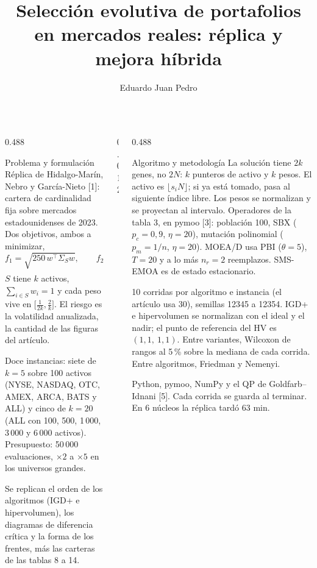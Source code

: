 \documentclass[final]{beamer}
\title{Selección evolutiva de portafolios en mercados reales: réplica y mejora híbrida}
\author{Eduardo \texorpdfstring{\quad\textperiodcentered\quad}{ y }Juan Pedro}
\institute{Tecnológico de Monterrey \quad MA2015.201 \quad Agosto--diciembre 2026}
\begin{document}
\begin{frame}[t]
\vspace{2.5mm}

\begin{columns}[t,onlytextwidth]
\begin{column}{0.488\textwidth}
\begin{block}{Problema y formulación}
Réplica de Hidalgo-Marín, Nebro y García-Nieto [1]: cartera de cardinalidad fija sobre mercados estadounidenses de 2023. Dos objetivos, ambos a minimizar,
\[
f_1=\sqrt{250\,w^{\top}\Sigma_{S}w},
\qquad
f_2=-\sum_{j\in S}w_{j}R_{j}.
\]
\(S\) tiene \(k\) activos, \(\sum_{i\in S} w_i=1\) y cada peso vive en \(\bigl[\tfrac{1}{2k},\tfrac{2}{k}\bigr]\). El riesgo es la volatilidad anualizada, la cantidad de las figuras del artículo.

Doce instancias: siete de \(k=5\) sobre 100 activos (NYSE, NASDAQ, OTC, AMEX, ARCA, BATS y ALL) y cinco de \(k=20\) (ALL con 100, 500, 1\,000, 3\,000 y 6\,000 activos). Presupuesto: 50\,000 evaluaciones, \(\times 2\) a \(\times 5\) en los universos grandes.

Se replican el orden de los algoritmos (IGD+ e hipervolumen), los diagramas de diferencia crítica y la forma de los frentes, más las carteras de las tablas 8 a 14.
\end{block}
\end{column}
\begin{column}{0.012\textwidth}\end{column}
\begin{column}{0.488\textwidth}
\begin{block}{Algoritmo y metodología}
La solución tiene \(2k\) genes, no \(2N\): \(k\) punteros de activo y \(k\) pesos. El activo es \(\lfloor s_{i}N\rfloor\); si ya está tomado, pasa al siguiente índice libre. Los pesos se normalizan y se proyectan al intervalo. Operadores de la tabla 3, en pymoo [3]: población 100, SBX (\(p_{c}=0{,}9\), \(\eta=20\)), mutación polinomial (\(p_{m}=1/n\), \(\eta=20\)). MOEA/D usa PBI (\(\theta=5\)), \(T=20\) y a lo más \(n_{r}=2\) reemplazos. SMS-EMOA es de estado estacionario.

10 corridas por algoritmo e instancia (el artículo usa 30), semillas 12345 a 12354. IGD+ e hipervolumen se normalizan con el ideal y el nadir; el punto de referencia del HV es \((1{,}1,\ 1{,}1)\). Entre variantes, Wilcoxon de rangos al 5\,\% sobre la mediana de cada corrida. Entre algoritmos, Friedman y Nemenyi.

Python, pymoo, NumPy y el QP de Goldfarb--Idnani [5]. Cada corrida se guarda al terminar. En 6 núcleos la réplica tardó 63 min.


\end{block}
\end{column}
\end{columns}
\end{frame}
\end{document}
